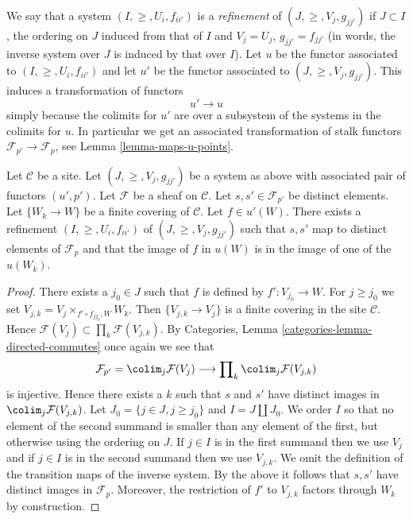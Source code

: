 \medskip\noindent
We say that a system $(I, \geq, U_i, f_{ii'})$
is a {\it refinement} of $(J, \geq, V_j, g_{jj'})$ if
$J \subset I$, the ordering on $J$ induced from that of $I$
and $V_j = U_j$, $g_{jj'} = f_{jj'}$ (in words, the inverse system
over $J$ is induced by that over $I$). Let $u$ be the functor
associated to $(I, \geq, U_i, f_{ii'})$ and let $u'$ be the
functor associated to $(J, \geq, V_j, g_{jj'})$.
This induces a transformation of functors
$$
u' \longrightarrow u
$$
simply because the colimits for $u'$ are over a subsystem
of the systems in the colimits for $u$.
In particular we get an associated transformation of
stalk functors $\mathcal{F}_{p'} \to \mathcal{F}_p$,
see Lemma \ref{lemma-maps-u-points}.

\begin{lemma}
\label{lemma-refine}
Let $\mathcal{C}$ be a site.
Let $(J, \geq, V_j, g_{jj'})$ be a system as above with associated
pair of functors $(u', p')$.
Let $\mathcal{F}$ be a sheaf on $\mathcal{C}$.
Let $s, s' \in \mathcal{F}_{p'}$ be distinct elements.
Let $\{W_k \to W\}$ be a finite covering of $\mathcal{C}$.
Let $f \in u'(W)$.
There exists a refinement $(I, \geq, U_i, f_{ii'})$
of $(J, \geq, V_j, g_{jj'})$ such that $s, s'$ map
to distinct elements of $\mathcal{F}_p$ and that
the image of $f$ in $u(W)$ is in the image of one of
the $u(W_k)$.
\end{lemma}

\begin{proof}
There exists a $j_0 \in J$ such that $f$ is defined by $f' : V_{j_0} \to W$.
For $j \geq j_0$ we set $V_{j, k} = V_j \times_{f'\circ f_{j j_0}, W} W_k$.
Then $\{V_{j, k} \to V_j\}$ is a finite covering in the site
$\mathcal{C}$. Hence
$\mathcal{F}(V_j) \subset \prod_k \mathcal{F}(V_{j, k})$.
By Categories, Lemma \ref{categories-lemma-directed-commutes}
once again we see that
$$
\mathcal{F}_{p'} =
\colim_j \mathcal{F}(V_j)
\longrightarrow
\prod\nolimits_k \colim_j \mathcal{F}(V_{j, k})
$$
is injective. Hence there exists a $k$ such that $s$ and $s'$
have distinct images in $\colim_j \mathcal{F}(V_{j, k})$.
Let $J_0 = \{j \in J, j \geq j_0\}$ and $I = J \amalg J_0$.
We order $I$ so that no element of the second summand
is smaller than any element of the first, but otherwise
using the ordering on $J$. If $j \in I$ is in the first
summand then we use $V_j$ and if $j \in I$ is in the second
summand then we use $V_{j, k}$. We omit the definition
of the transition maps of the inverse system. By the above
it follows that $s, s'$ have distinct images in $\mathcal{F}_p$.
Moreover, the restriction of $f'$ to $V_{j, k}$ factors
through $W_k$ by construction.
\end{proof}

